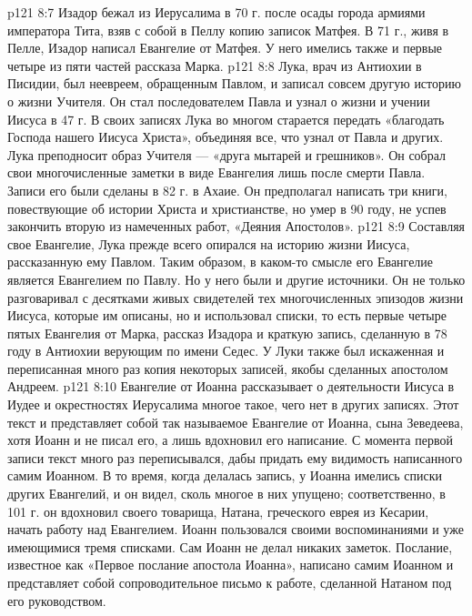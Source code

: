 \vs p121 8:7 Изадор бежал из Иерусалима в 70 г. после осады города армиями императора Тита, взяв с собой в Пеллу копию записок Матфея. В 71 г., живя в Пелле, Изадор написал Евангелие от Матфея. У него имелись также и первые четыре из пяти частей рассказа Марка.
\vs p121 8:8 \bibnobreakspace {} Лука, врач из Антиохии в Писидии, был неевреем, обращенным Павлом, и записал совсем другую историю о жизни Учителя. Он стал последователем Павла и узнал о жизни и учении Иисуса в 47 г. В своих записях Лука во многом старается передать «благодать Господа нашего Иисуса Христа», объединяя все, что узнал от Павла и других. Лука преподносит образ Учителя --- «друга мытарей и грешников». Он собрал свои многочисленные заметки в виде Евангелия лишь после смерти Павла. Записи его были сделаны в 82 г. в Ахаие. Он предполагал написать три книги, повествующие об истории Христа и христианстве, но умер в 90 году, не успев закончить вторую из намеченных работ, «Деяния Апостолов».
\vs p121 8:9 Составляя свое Евангелие, Лука прежде всего опирался на историю жизни Иисуса, рассказанную ему Павлом. Таким образом, в каком\hyp{}то смысле его Евангелие является Евангелием по Павлу. Но у него были и другие источники. Он не только разговаривал с десятками живых свидетелей тех многочисленных эпизодов жизни Иисуса, которые им описаны, но и использовал списки, то есть первые четыре пятых Евангелия от Марка, рассказ Изадора и краткую запись, сделанную в 78 году в Антиохии верующим по имени Седес. У Луки также был искаженная и переписанная много раз копия некоторых записей, якобы сделанных апостолом Андреем.
\vs p121 8:10 \bibnobreakspace {} Евангелие от Иоанна рассказывает о деятельности Иисуса в Иудее и окрестностях Иерусалима многое такое, чего нет в других записях. Этот текст и представляет собой так называемое Евангелие от Иоанна, сына Зеведеева, хотя Иоанн и не писал его, а лишь вдохновил его написание. С момента первой записи текст много раз переписывался, дабы придать ему видимость написанного самим Иоанном. В то время, когда делалась запись, у Иоанна имелись списки других Евангелий, и он видел, сколь многое в них упущено; соответственно, в 101 г. он вдохновил своего товарища, Натана, греческого еврея из Кесарии, начать работу над Евангелием. Иоанн пользовался своими воспоминаниями и уже имеющимися тремя списками. Сам Иоанн не делал никаких заметок. Послание, известное как «Первое послание апостола Иоанна», написано самим Иоанном и представляет собой сопроводительное письмо к работе, сделанной Натаном под его руководством.
